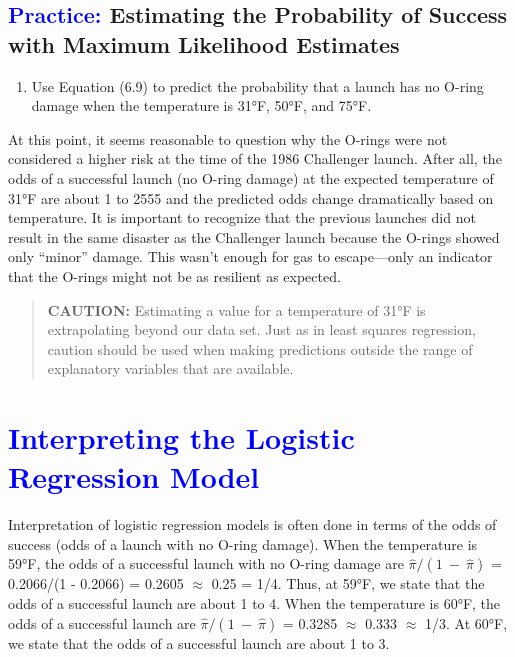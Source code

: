 \documentclass[
]{report}
\providecommand{\tightlist}{%
  \setlength{\itemsep}{0pt}\setlength{\parskip}{0pt}}
\begin{document}
\hypertarget{estimating-the-probability-of-success-with-maximum-likelihood-estimates}{%
\subsection*{\texorpdfstring{\textcolor{blue}{Practice:} Estimating the Probability of Success with Maximum Likelihood Estimates}{ Estimating the Probability of Success with Maximum Likelihood Estimates}}\label{estimating-the-probability-of-success-with-maximum-likelihood-estimates}}

\begin{enumerate}
\def\labelenumi{\arabic{enumi}.}
\setcounter{enumi}{6}
\tightlist
\item
  Use Equation (6.9) to predict the probability that a launch has no O-ring damage when the temperature is 31°F, 50°F, and 75°F.
\end{enumerate}

At this point, it seems reasonable to question why the O-rings were not considered a higher risk at the time of the 1986 Challenger launch. After all, the odds of a successful launch (no O-ring damage) at the expected temperature of 31°F are about 1 to 2555 and the predicted odds change dramatically based on temperature. It is important to recognize that the previous launches did not result in the same disaster as the Challenger launch because the O-rings showed only ``minor'' damage. This wasn't enough for gas to escape---only an indicator that the O-rings might not be as resilient as expected.

\begin{quote}
\textbf{CAUTION:} Estimating a value for a temperature of 31°F is extrapolating beyond our data set. Just as in least squares regression, caution should be used when making predictions outside the range of explanatory variables that are available.
\end{quote}

\hypertarget{section-64}{%
\section{\texorpdfstring{\textcolor{blue}{ Interpreting the Logistic Regression Model}}{}}\label{section-64}}

Interpretation of logistic regression models is often done in terms of the odds of success (odds of a launch with no O-ring damage). When the temperature is 59°F, the odds of a successful launch with no O-ring damage are \(\scriptstyle \hat\pi/(1 \ -\  \hat\pi)\) = 0.2066/(1 - 0.2066) = 0.2605 \(\approx\) 0.25 = 1/4. Thus, at 59°F, we state that the odds of a successful launch are about 1 to 4. When the temperature is 60°F, the odds of a successful launch are \(\scriptstyle \hat\pi/(1 \ -\  \hat\pi)\) = 0.3285 \(\approx\) 0.333 \(\approx\) 1/3. At 60°F, we state that the odds of a successful launch are about 1 to 3.
\end{document}
